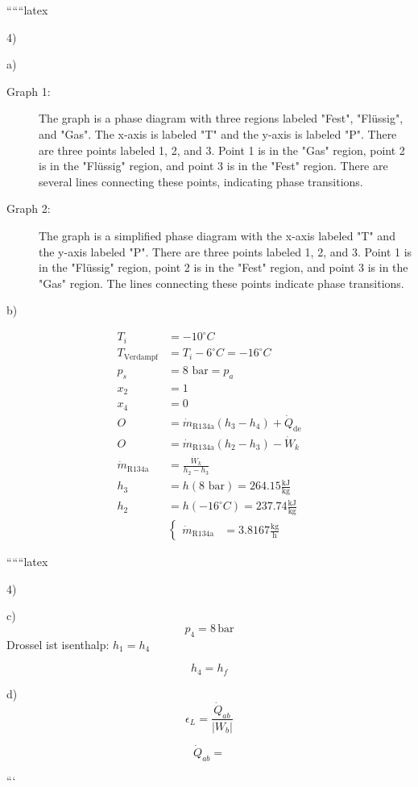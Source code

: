
``````latex


4) 

a)

\begin{description}
    \item[Graph 1:] The graph is a phase diagram with three regions labeled "Fest", "Flüssig", and "Gas". The x-axis is labeled "T" and the y-axis is labeled "P". There are three points labeled 1, 2, and 3. Point 1 is in the "Gas" region, point 2 is in the "Flüssig" region, and point 3 is in the "Fest" region. There are several lines connecting these points, indicating phase transitions.
    \item[Graph 2:] The graph is a simplified phase diagram with the x-axis labeled "T" and the y-axis labeled "P". There are three points labeled 1, 2, and 3. Point 1 is in the "Flüssig" region, point 2 is in the "Fest" region, and point 3 is in the "Gas" region. The lines connecting these points indicate phase transitions.
\end{description}

b)

\begin{align*}
T_i &= -10^\circ C \\
T_{\text{Verdampf}} &= T_i - 6^\circ C = -16^\circ C \\
p_s &= 8 \text{ bar} = p_a \\
x_2 &= 1 \\
x_4 &= 0 \\
O &= \dot{m}_{\text{R134a}} (h_3 - h_4) + \dot{Q}_{\text{de}} \\
O &= \dot{m}_{\text{R134a}} (h_2 - h_3) - \dot{W}_k \\
\dot{m}_{\text{R134a}} &= \frac{\dot{W}_k}{h_2 - h_3} \\
h_3 &= h(8 \text{ bar}) = 264.15 \frac{\text{kJ}}{\text{kg}} \\
h_2 &= h(-16^\circ C) = 237.74 \frac{\text{kJ}}{\text{kg}} \\
&\left\{
\begin{aligned}
\dot{m}_{\text{R134a}} &= 3.8167 \frac{\text{kg}}{\text{h}}
\end{aligned}
\right.
\end{align*}

``````latex


4)

c) 
\[
p_4 = 8 \, \text{bar}
\]
Drossel ist isenthalp: \( h_1 = h_4 \)

\[
h_4 = h_f
\]

d) 
\[
\epsilon_L = \frac{\dot{Q}_{ab}}{|W_{b}|}
\]

\[
\dot{Q}_{ab} =
\]

```